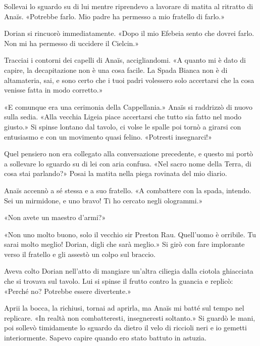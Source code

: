 Sollevai lo sguardo su di lui mentre riprendevo a lavorare di matita al
ritratto di Anaïs. «Potrebbe farlo. Mio padre ha permesso a mio fratello
di farlo.»

Dorian si rincuorò immediatamente. «Dopo il mio Efebeia sento che dovrei
farlo. Non mi ha permesso di uccidere il Cielcin.»

Tracciai i contorni dei capelli di Anaïs, accigliandomi. «A quanto mi è
dato di capire, la decapitazione non è una cosa facile. La Spada Bianca
non è di altamateria, sai, e sono certo che i tuoi padri volessero solo
accertarsi che la cosa venisse fatta in modo corretto.»

«E comunque era una cerimonia della Cappellania.» Anaïs si raddrizzò di
nuovo sulla sedia. «Alla vecchia Ligeia piace accertarsi che tutto sia
fatto nel modo giusto.» Si spinse lontano dal tavolo, ci volse le spalle
poi tornò a girarsi con entusiasmo e con un movimento quasi felino.
«Potresti insegnarci!»

Quel pensiero non era collegato alla conversazione precedente, e questo
mi portò a sollevare lo sguardo su di lei con aria confusa. «Nel sacro
nome della Terra, di cosa stai parlando?» Posai la matita nella piega
rovinata del mio diario.

Anaïs accennò a sé stessa e a suo fratello. «A combattere con la spada,
intendo. Sei un mirmidone, e uno bravo! Ti ho cercato negli ologrammi.»

«Non avete un maestro d'armi?»

«Non uno molto buono, solo il vecchio sir Preston Rau. Quell'uomo è
orribile. Tu sarai molto meglio! Dorian, digli che sarà meglio.» Si girò
con fare implorante verso il fratello e gli assestò un colpo sul
braccio.

Aveva colto Dorian nell'atto di mangiare un'altra ciliegia dalla ciotola
ghiacciata che si trovava sul tavolo. Lui si spinse il frutto contro la
guancia e replicò: «Perché no? Potrebbe essere divertente.»

Aprii la bocca, la richiusi, tornai ad aprirla, ma Anaïs mi batté sul
tempo nel replicare. «In realtà non combatteresti, insegneresti
soltanto.» Si guardò le mani, poi sollevò timidamente lo sguardo da
dietro il velo di riccioli neri e io gemetti interiormente. Sapevo
capire quando ero stato battuto in astuzia.

\begin{figure}
	\centering
	\def\svgwidth{\columnwidth}
	\scalebox{0.2}{}
\end{figure}


